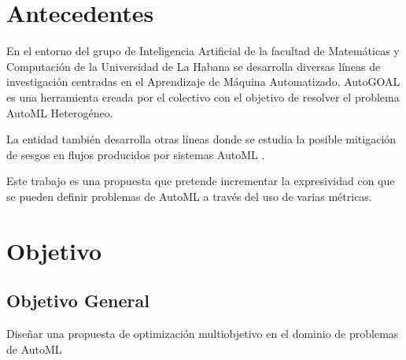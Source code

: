 

\section*{Antecedentes}

En el entorno del grupo de Inteligencia Artificial de la facultad de Matem\'aticas y Computaci\'on de la Universidad de La Habana se desarrolla diversas l\'ineas de investigaci\'on centradas en el Aprendizaje de M\'aquina Automatizado. AutoGOAL  es una herramienta creada por el colectivo con el objetivo de resolver el problema AutoML Heterog\'eneo.

La entidad tambi\'en desarrolla otras l\'ineas donde se estudia la posible mitigaci\'on de sesgos en flujos producidos por sistemas AutoML . 

Este trabajo es una propuesta que pretende incrementar la expresividad con que se pueden definir problemas de AutoML a trav\'es del uso de varias m\'etricas.


 
\section*{Objetivo}
\subsection*{Objetivo General}
Dise\~nar una propuesta de optimizaci\'on multiobjetivo en el dominio de problemas de AutoML
